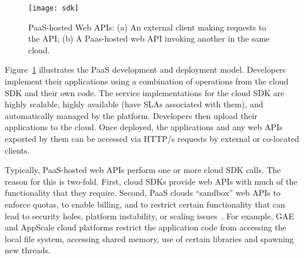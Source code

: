 
\begin{figure}
\centering
\texttt{[image: sdk]}
\caption{PaaS-hosted Web APIs: (a) An external client making requests
to the API;
(b) A Paas-hosted web API invoking another in the same cloud.
\label{fig:cloud_app_model}
}
\vspace{-0.2in}
\end{figure}

Figure~\ref{fig:cloud_app_model} illustrates the PaaS development and deployment model.
Developers implement their applications using a combination of operations
from the cloud SDK and their own code.  The service implementations for the 
cloud SDK are highly scalable, highly available (have SLAs associated with them),
and automatically managed by the platform. Developers then
upload their applications to the cloud.
Once deployed, the applications and any web APIs exported by them can be accessed 
via HTTP/s requests by external or co-located clients.

Typically, PaaS-hosted web APIs perform one or more
cloud SDK calls.  The reason for this is two-fold.  First, 
cloud SDKs provide web APIs with much of the functionality that they require.
Second, PaaS clouds ``sandbox'' web APIs to enforce quotas, to enable billing,
and to restrict certain functionality
that can lead to security holes, platform instability, or scaling issues~\cite{gae-sandbox}.
For example, GAE and AppScale cloud platforms restrict the application code
from accessing the local file system, accessing shared memory, use of certain libraries
and spawning new threads.

